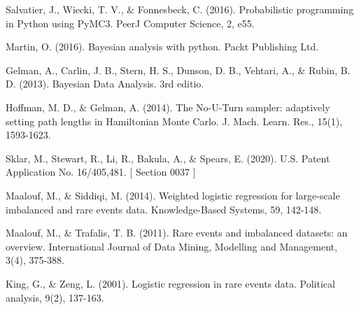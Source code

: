 \documentclass[twoside]{article}
\begin{document}
\begin{thebibliography}{20}

Salvatier, J., Wiecki, T. V., \& Fonnesbeck, C. (2016). Probabilistic programming in Python using PyMC3. PeerJ Computer Science, 2, e55.

Martin, O. (2016). Bayesian analysis with python. Packt Publishing Ltd.

Gelman, A., Carlin, J. B., Stern, H. S., Dunson, D. B., Vehtari, A., \& Rubin, B. D. (2013). Bayesian Data Analysis. 3rd editio.

Hoffman, M. D., \& Gelman, A. (2014). The No-U-Turn sampler: adaptively setting path lengths in Hamiltonian Monte Carlo. J. Mach. Learn. Res., 15(1), 1593-1623.

Sklar, M., Stewart, R., Li, R., Bakula, A., \& Spears, E. (2020). U.S. Patent Application No. 16/405,481. [ Section 0037 ]

Maalouf, M., \& Siddiqi, M. (2014). Weighted logistic regression for large-scale imbalanced and rare events data. Knowledge-Based Systems, 59, 142-148.

Maalouf, M., \& Trafalis, T. B. (2011). Rare events and imbalanced datasets: an overview. International Journal of Data Mining, Modelling and Management, 3(4), 375-388.

King, G., \& Zeng, L. (2001). Logistic regression in rare events data. Political analysis, 9(2), 137-163.


\end{thebibliography}
\end{document}
